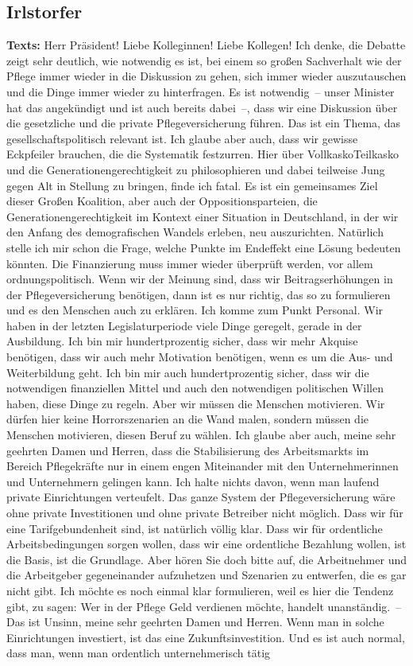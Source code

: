 \documentclass{article}
\begin{document}
\subsection{Irlstorfer}
\noindent\textbf{Texts:} Herr Präsident! Liebe Kolleginnen! Liebe Kollegen! Ich denke, die Debatte zeigt sehr deutlich, wie notwendig es ist, bei einem so großen Sachverhalt wie der Pflege immer wieder in die Diskussion zu gehen, sich immer wieder auszutauschen und die Dinge immer wieder zu hinterfragen. Es ist notwendig – unser Minister hat das angekündigt und ist auch bereits dabei –, dass wir eine Diskussion über die gesetzliche und die private Pflegeversicherung führen. Das ist ein Thema, das gesellschaftspolitisch relevant ist. Ich glaube aber auch, dass wir gewisse Eckpfeiler brauchen, die die Systematik festzurren. Hier über Vollkasko\/Teilkasko und die Generationengerechtigkeit zu philosophieren und dabei teilweise Jung gegen Alt in Stellung zu bringen, finde ich fatal. Es ist ein gemeinsames Ziel dieser Großen Koalition, aber auch der Oppositionsparteien, die Generationengerechtigkeit im Kontext einer Situation in Deutschland, in der wir den Anfang des demografischen Wandels erleben, neu auszurichten.  Natürlich stelle ich mir schon die Frage, welche Punkte im Endeffekt eine Lösung bedeuten könnten. Die Finanzierung muss immer wieder überprüft werden, vor allem ordnungspolitisch. Wenn wir der Meinung sind, dass wir Beitragserhöhungen in der Pflegeversicherung benötigen, dann ist es nur richtig, das so zu formulieren und es den Menschen auch zu erklären. Ich komme zum Punkt Personal. Wir haben in der letzten Legislaturperiode viele Dinge geregelt, gerade in der Ausbildung. Ich bin mir hundertprozentig sicher, dass wir mehr Akquise benötigen, dass wir auch mehr Motivation benötigen, wenn es um die Aus- und Weiterbildung geht. Ich bin mir auch hundertprozentig sicher, dass wir die notwendigen finanziellen Mittel und auch den notwendigen politischen Willen haben, diese Dinge zu regeln. Aber wir müssen die Menschen motivieren. Wir dürfen hier keine Horrorszenarien an die Wand malen, sondern müssen die Menschen motivieren, diesen Beruf zu wählen.  Ich glaube aber auch, meine sehr geehrten Damen und Herren, dass die Stabilisierung des Arbeitsmarkts im Bereich Pflegekräfte nur in einem engen Miteinander mit den Unternehmerinnen und Unternehmern gelingen kann. Ich halte nichts davon, wenn man laufend private Einrichtungen verteufelt. Das ganze System der Pflegeversicherung wäre ohne private Investitionen und ohne private Betreiber nicht möglich.  Dass wir für eine Tarifgebundenheit sind, ist natürlich völlig klar.  Dass wir für ordentliche Arbeitsbedingungen sorgen wollen, dass wir eine ordentliche Bezahlung wollen, ist die Basis, ist die Grundlage. Aber hören Sie doch bitte auf, die Arbeitnehmer und die Arbeitgeber gegeneinander aufzuhetzen und Szenarien zu entwerfen, die es gar nicht gibt.  Ich möchte es noch einmal klar formulieren, weil es hier die Tendenz gibt, zu sagen: Wer in der Pflege Geld verdienen möchte, handelt unanständig. – Das ist Unsinn, meine sehr geehrten Damen und Herren. Wenn man in solche Einrichtungen investiert, ist das eine Zukunftsinvestition. Und es ist auch normal, dass man, wenn man ordentlich unternehmerisch tätig 
\end{document}
